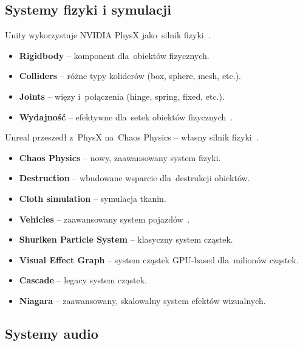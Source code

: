 \subsection{Systemy fizyki i symulacji}


Unity wykorzystuje NVIDIA PhysX jako~silnik fizyki~\cite{nvidia_physx}.

\begin{itemize}
    \item \textbf{Rigidbody} -- komponent dla~obiektów fizycznych.
    \item \textbf{Colliders} -- różne typy koliderów (box, sphere, mesh, etc.).
    \item \textbf{Joints} -- więzy i~połączenia (hinge, spring, fixed, etc.).
    \item \textbf{Wydajność} -- efektywne dla~setek obiektów fizycznych~\cite{messaoudi2017performance}.
\end{itemize}

Unreal przeszedł z~PhysX na~Chaos Physics --
własny silnik fizyki~\cite{unreal_docs}.

\begin{itemize}
    \item \textbf{Chaos Physics} -- nowy, zaawansowany system fizyki.
    \item \textbf{Destruction} -- wbudowane wsparcie dla~destrukcji obiektów.
    \item \textbf{Cloth simulation} -- symulacja tkanin.
    \item \textbf{Vehicles} -- zaawansowany system pojazdów~\cite{gregory2018game}.
\end{itemize}


\begin{itemize}
    \item \textbf{Shuriken Particle System} -- klasyczny system cząstek.
    \item \textbf{Visual Effect Graph} -- system cząstek GPU-based dla~milionów cząstek.
\end{itemize}

\begin{itemize}
    \item \textbf{Cascade} -- legacy system cząstek.
    \item \textbf{Niagara} -- zaawansowany, skalowalny system efektów wizualnych.
\end{itemize}

\subsection{Systemy audio}


